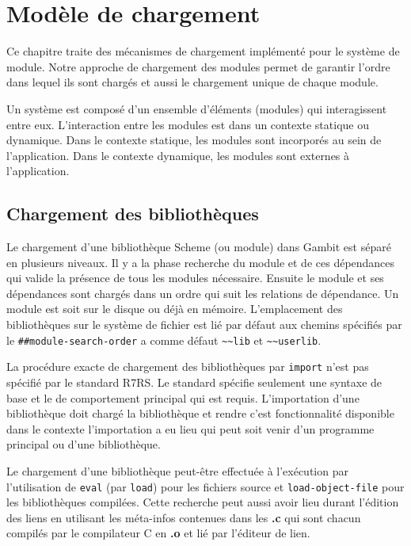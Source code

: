 
\chapter{Modèle de chargement}
\label{ch:loading-model}

Ce chapitre traite des mécanismes de chargement implémenté pour
le système de module. Notre approche de chargement des modules
permet de garantir l'ordre dans lequel ils sont chargés et aussi
le chargement unique de chaque module.

Un système est composé d'un ensemble d'éléments (modules) qui interagissent
entre eux. L'interaction entre les modules est dans un contexte statique ou
dynamique. Dans le contexte statique, les modules sont incorporés au sein de
l'application. Dans le contexte dynamique, les modules sont externes à
l'application.

\section{Chargement des bibliothèques}


Le chargement d'une bibliothèque Scheme (ou module) dans Gambit est séparé en
plusieurs niveaux. Il y a la phase recherche du module et de ces dépendances
qui valide la présence de tous les modules nécessaire.  Ensuite le module et
ses dépendances sont chargés dans un ordre qui suit les relations de
dépendance.  Un module est soit sur le disque ou déjà en mémoire.
L'emplacement des bibliothèques sur le système de fichier est lié par défaut
aux chemins spécifiés par le \lstinline{##module-search-order} a comme défaut
\lstinline{~~lib} et \lstinline{~~userlib}.

La procédure exacte de chargement des bibliothèques par \verb|import| n'est pas
spécifié par le standard R7RS. Le standard spécifie seulement une syntaxe de
base et le de comportement principal qui est requis. L'importation d'une
bibliothèque doit chargé la bibliothèque et rendre c'est fonctionnalité
disponible dans le contexte l'importation a eu lieu qui peut soit venir d'un
programme principal ou d'une bibliothèque.

Le chargement d'une bibliothèque peut-être effectuée à l'exécution par
l'utilisation de \texttt{eval} (par \texttt{load}) pour les fichiers source et
\texttt{load-object-file} pour les bibliothèques compilées. Cette recherche
peut aussi avoir lieu durant l'édition des liens en utilisant les méta-infos
contenues dans les \textbf{.c} qui sont chacun compilés par le compilateur C
en \textbf{.o} et lié par l'éditeur de lien.

